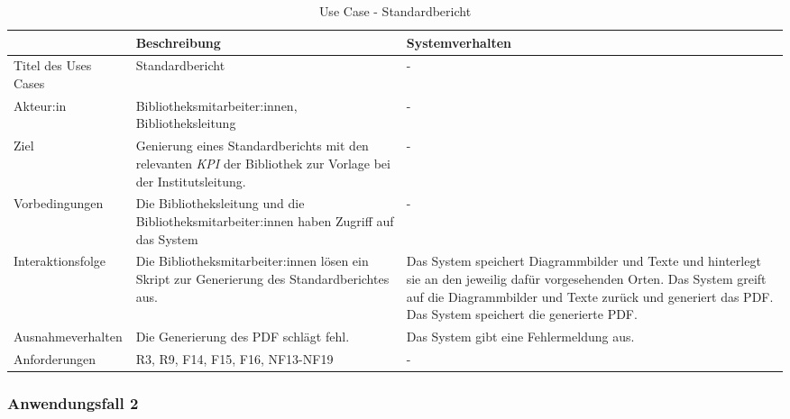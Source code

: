 \begingroup
\setlength{\tabcolsep}{10pt} %
\renewcommand{\arraystretch}{1.25} 
\begin{table}[H]
    \centering
    \begin{adjustbox}{max width=\textwidth}
    \begin{tabular}{lp{6.5cm}p{6.5cm}}
       \toprule
       \textbf{}          & \textbf{Beschreibung} &\textbf{Systemverhalten}\\
       \midrule
        Titel des Uses Cases             &Standardbericht  & -\\
        Akteur:in                        &Bibliotheksmitarbeiter:innen, Bibliotheksleitung & -\\
        Ziel                             &Genierung eines Standardberichts mit den relevanten \textit{\acrshort{KPI}} der Bibliothek zur Vorlage bei der Institutsleitung. & -\\
        Vorbedingungen                   &Die Bibliotheksleitung und die Bibliotheksmitarbeiter:innen haben Zugriff auf das System & -\\
        Interaktionsfolge                &Die Bibliotheksmitarbeiter:innen lösen ein Skript zur Generierung des Standardberichtes aus. & Das System speichert Diagrammbilder und Texte und hinterlegt sie an den jeweilig dafür vorgesehenden Orten. Das System greift auf die Diagrammbilder und Texte zurück und generiert das PDF.
        Das System speichert die generierte PDF.\\
        Ausnahmeverhalten               &Die Generierung des PDF schlägt fehl. & Das System gibt eine Fehlermeldung aus.\\
        Anforderungen                   &R3, R9, F14, F15, F16, NF13-NF19 & -\\ 
        \bottomrule
    \end{tabular}
    \end{adjustbox}
    \caption{%
    Use Case - Standardbericht
    }
    \label{tab:UC_Standardbericht}
    \end{table}
\endgroup
\subsubsection{Anwendungsfall 2}

